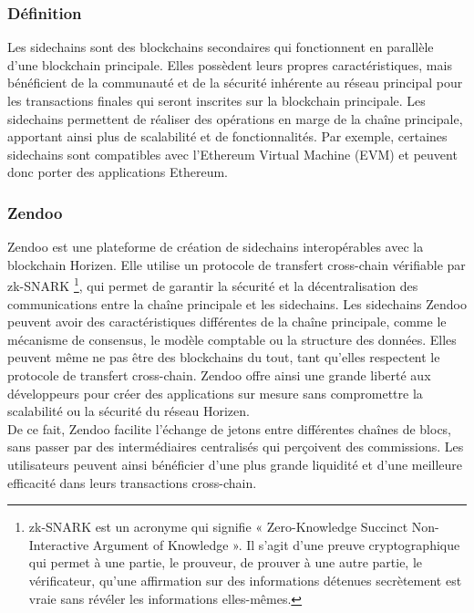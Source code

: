 \subsubsection{Définition}

Les sidechains sont des blockchains secondaires qui fonctionnent en parallèle d'une blockchain principale. Elles possèdent leurs propres caractéristiques, mais bénéficient de la communauté et de la sécurité inhérente au réseau principal pour les transactions finales qui seront inscrites sur la blockchain principale. Les sidechains permettent de réaliser des opérations en marge de la chaîne principale, apportant ainsi plus de scalabilité et de fonctionnalités. Par exemple, certaines sidechains sont compatibles avec l'Ethereum Virtual Machine (EVM) et peuvent donc porter des applications Ethereum.

\subsubsection{Zendoo}

Zendoo est une plateforme de création de sidechains interopérables avec la blockchain Horizen. Elle utilise un protocole de transfert cross-chain vérifiable par zk-SNARK \footnote{zk-SNARK est un acronyme qui signifie « Zero-Knowledge Succinct Non-Interactive Argument of Knowledge ». Il s'agit d'une preuve cryptographique qui permet à une partie, le prouveur, de prouver à une autre partie, le vérificateur, qu'une affirmation sur des informations détenues secrètement est vraie sans révéler les informations elles-mêmes.}, qui permet de garantir la sécurité et la décentralisation des communications entre la chaîne principale et les sidechains. Les sidechains Zendoo peuvent avoir des caractéristiques différentes de la chaîne principale, comme le mécanisme de consensus, le modèle comptable ou la structure des données. Elles peuvent même ne pas être des blockchains du tout, tant qu'elles respectent le protocole de transfert cross-chain. Zendoo offre ainsi une grande liberté aux développeurs pour créer des applications sur mesure sans compromettre la scalabilité ou la sécurité du réseau Horizen.\\
De ce fait, Zendoo facilite l'échange de jetons entre différentes chaînes de blocs, sans passer par des intermédiaires centralisés qui perçoivent des commissions. Les utilisateurs peuvent ainsi bénéficier d'une plus grande liquidité et d'une meilleure efficacité dans leurs transactions cross-chain.

